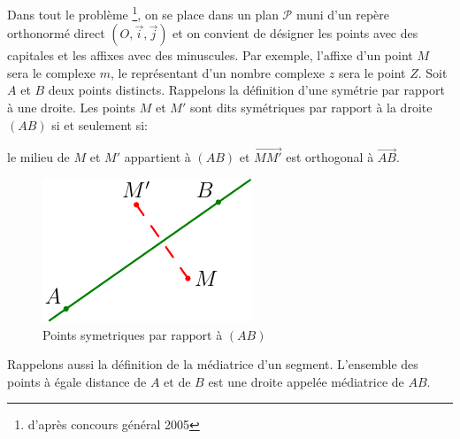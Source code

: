 Dans tout le problème \footnote{d'après concours général 2005}, on se place dans un plan $\mathcal P$ muni d'un repère orthonormé direct $(O,\overrightarrow{i},\overrightarrow{j})$ et on convient de désigner les points avec des capitales et les affixes avec des minuscules. Par exemple, l'affixe d'un point $M$ sera le complexe $m$, le représentant d'un nombre complexe $z$ sera le point $Z$.\newline
Soit $A$ et $B$ deux points distincts.\newline
Rappelons la définition d'une symétrie par rapport à une droite. Les points $M$ et $M'$ sont dits symétriques par rapport à la droite $(AB)$ si et seulement si:
\begin{center}
  le milieu de $M$ et $M'$ appartient à $(AB)$ et $\overrightarrow{M M'}$ est orthogonal à $\overrightarrow{AB}$.
\end{center}
\begin{figure}[!ht]
  \centering
  \includegraphics{Ecomp2_0.pdf}
  \caption{Points symetriques par rapport à $(AB)$}
  \label{fig:Ecomp2_0}
\end{figure}
Rappelons aussi la définition de la médiatrice d'un segment. L'ensemble des points à égale distance de $A$ et de $B$ est une droite appelée médiatrice de $AB$.

